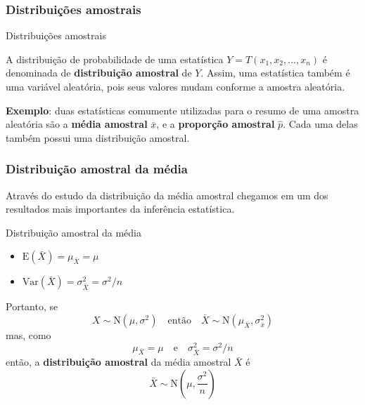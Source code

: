 \documentclass[11pt]{beamer}
\begin{document}
\begin{frame}
\frametitle{Distribuições amostrais}

\begin{block}{Distribuições amostrais}

A distribuição de probabilidade de uma estatística
\(Y = T(x_1, x_2, \ldots, x_n)\) é denominada de \textbf{distribuição
amostral} de \(Y\). Assim, uma estatística também é uma variável
aleatória, pois seus valores mudam conforme a amostra aleatória.
\end{block}

\begin{block}{}
\textbf{Exemplo}: duas estatísticas comumente utilizadas para o resumo
de uma amostra aleatória são a \textbf{média amostral} \(\bar{x}\), e a
\textbf{proporção amostral} \(\hat{p}\). Cada uma delas também possui
uma distribuição amostral.
\end{block}
\end{frame}

\begin{frame}
\frametitle{Distribuição amostral da média}

Através do estudo da distribuição da média amostral chegamos em um dos
resultados mais importantes da inferência estatística.

\begin{block}{Distribuição amostral da média}

\begin{itemize}
\item
  \(\text{E}(\bar{X}) = \mu_{\bar{X}} = \mu\)
\item
  \(\text{Var}(\bar{X}) = \sigma^2_{\bar{X}} = \sigma^2/n\)
\end{itemize}

Portanto, se \[X \sim \text{N}(\mu, \sigma^2) \quad \text{então} \quad
\bar{X} \sim \text{N}(\mu_{\bar{X}}, \sigma^2_{\bar{x}})\] mas, como
\[\mu_{\bar{X}} = \mu \quad \text{e} \quad \sigma^2_{\bar{X}} =
\sigma^2/n\] então, a \textbf{distribuição amostral} da média amostral
\(\bar{X}\) é
\[\bar{X} \sim \text{N}\left(\mu, \frac{\sigma^2}{n} \right)\]
\end{block}
\end{frame}
\end{document}
